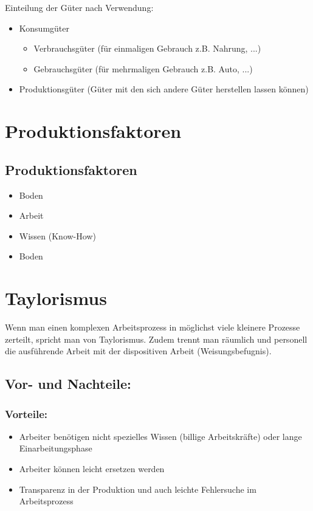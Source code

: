 \documentclass[a4paper]{report}
\begin{document}
Einteilung der Güter nach Verwendung:

\begin{itemize}
\item Konsumgüter
	\begin{itemize}
	\item Verbrauchsgüter (für einmaligen Gebrauch z.B. Nahrung, ...)
	\item Gebrauchsgüter (für mehrmaligen Gebrauch z.B. Auto, ...)
	\end{itemize}
\item Produktionsgüter (Güter mit den sich andere Güter herstellen lassen können)
\end{itemize}

\chapter{Produktionsfaktoren}

\section{Produktionsfaktoren}

\begin{itemize}
\item Boden
\item Arbeit
\item Wissen (Know-How)
\item Boden
\end{itemize}




\chapter{Taylorismus}

Wenn man einen komplexen Arbeitsprozess in möglichst viele kleinere Prozesse zerteilt, spricht man von Taylorismus. Zudem trennt man räumlich und personell die ausführende Arbeit mit der dispositiven Arbeit (Weisungsbefugnis).

\section{Vor- und Nachteile:}

\subsection{Vorteile:}

\begin{itemize}
\item Arbeiter benötigen nicht spezielles Wissen (billige Arbeitskräfte) oder lange Einarbeitungsphase
\item Arbeiter können leicht ersetzen werden
\item Transparenz in der Produktion und auch leichte Fehlersuche im Arbeitsprozess
\end{itemize}
\end{document}
